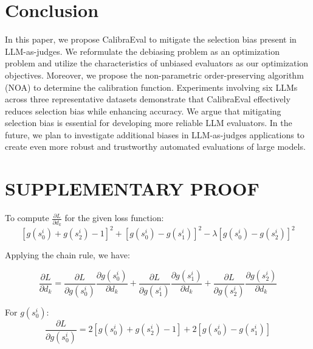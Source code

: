 \documentclass[sigconf]{acmart}
\begin{document}
\section{Conclusion}
In this paper, we propose CalibraEval to mitigate the selection bias present in LLM-as-judges.
We reformulate the debiasing problem as an optimization problem and utilize the characteristics of unbiased evaluators as our optimization objectives. Moreover, we propose the non-parametric order-preserving algorithm (NOA) to determine the calibration function.
Experiments involving six LLMs across three representative datasets demonstrate that CalibraEval effectively reduces selection bias while enhancing accuracy. We argue that mitigating selection bias is essential for developing more reliable LLM evaluators. In the future, we plan to investigate additional biases in LLM-as-judges applications to create even more robust and trustworthy automated evaluations of large models.







\clearpage

\appendix


\section{SUPPLEMENTARY PROOF}
\label{proof}
To compute  $\frac{\partial L}{\partial d_{k}}$ for the given loss function:
\begin{equation}\label{eqn-20} 
[g(s_{0}^{i}) + g(s_2^i)-1]^2+[ g(s_{0}^{i}) - g(s_1^i)]^2-\lambda[ g(s_{0}^{i}) - g(s_2^i)]^2 
\end{equation}

Applying the chain rule, we have:

\begin{equation}\label{eqn-21} 
\frac{\partial L}{\partial d_{k}}=\frac{\partial L}{\partial g\left(s_{0}^{i}\right)} \frac{\partial g\left(s_{0}^{i}\right)}{\partial d_{k}}+\frac{\partial L}{\partial g\left(s_{1}^{i}\right)} \frac{\partial g\left(s_{1}^{i}\right)}{\partial d_{k}}+\frac{\partial L}{\partial g\left(s_{2}^{i}\right)} \frac{\partial g\left(s_{2}^{i}\right)}{\partial d_{k}}
\end{equation}

For $g(s_0^i)$:
\begin{equation}\label{eqn-22} 
\frac{\partial L}{\partial g\left(s_{0}^{i}\right)}=2\left[g\left(s_{0}^{i}\right)+g\left(s_{2}^{i}\right)-1\right]+2\left[g\left(s_{0}^{i}\right)-g\left(s_{1}^{i}\right)\right]
\end{equation}
\end{document}
